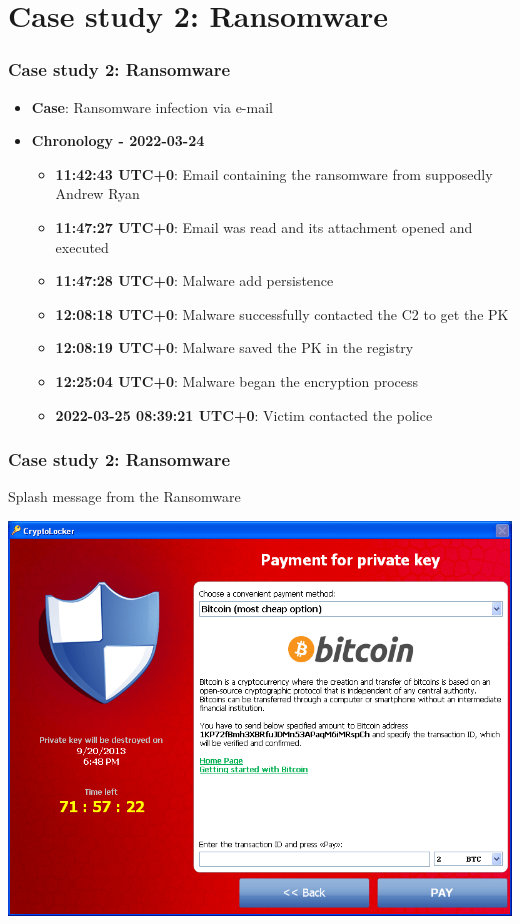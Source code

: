 \section{Case study 2: Ransomware}
\begin{frame}
    \frametitle{Case study 2: Ransomware}
    \begin{itemize}
        \item[] \textbf{Case}: Ransomware infection via e-mail
        \item[] \textbf{Chronology - 2022-03-24}
        \begin{itemize}
            \item[] \textbf{\small 11:42:43 UTC+0}: Email containing the ransomware from supposedly Andrew Ryan
            \item[] \textbf{\small 11:47:27 UTC+0}: Email was read and its attachment opened and executed
            \item[] \textbf{\small 11:47:28 UTC+0}: Malware add persistence
            \item[] \textbf{\small 12:08:18 UTC+0}: Malware successfully contacted the C2 to get the PK 
            \item[] \textbf{\small 12:08:19 UTC+0}: Malware saved the PK in the registry
            \item[] \textbf{\small 12:25:04 UTC+0}: Malware began the encryption process
            \item[] \textbf{\small 2022-03-25 08:39:21 UTC+0}: Victim contacted the police
        \end{itemize}
    \end{itemize}
\end{frame}

\begin{frame}
    \frametitle{Case study 2: Ransomware}
    Splash message from the Ransomware
    \begin{center}
        \includegraphics[width=0.8\linewidth]{./pictures/case2/ransom-btc.png}
    \end{center}
\end{frame}

